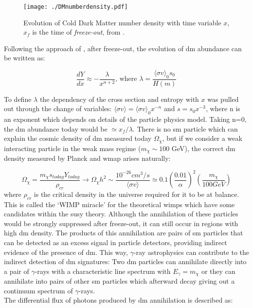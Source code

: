 \documentclass[main.tex]{subfiles}
\begin{document}
\begin{figure}[h]
\centering
 \texttt{[image: ./DMnumberdensity.pdf]}
  \caption{Evolution of Cold Dark Matter number density with time variable $x$, $x_{f}$ is the time of \textit{freeze-out}, from \cite{2017DMlectures}.}
    \label{fig:DMn}
\end{figure}

Following the approach of \cite{2017DMlectures}, after freeze-out, the evolution of \gls{dm} abundance can be written as:

\begin{equation}
    \frac{dY}{dx}\approx - \frac{\lambda}{x^{n+2}} \textrm{, where } \lambda = \frac{\langle\sigma v \rangle_{0}s_{0}}{H(m)}
\end{equation}

To define $\lambda$ the dependency of the cross section and entropy with $x$ was pulled out through the change of variables: $\langle\sigma v \rangle = \langle\sigma v \rangle_{0} x^{-n}$ and $s=s_{0}x^{-3}$, where n is an exponent which depends on details of the particle physics model. Taking n=0, the \gls{dm} abundance today would be $\simeq x_{f}/\lambda$.
There is no \gls{sm} particle which can explain the cosmic density of \gls{dm} measured today $\Omega_{\chi}$, but if we consider a weak interacting particle in the weak mass regime ($m_{\chi}\sim 100$ GeV), the correct \gls{dm} density measured by Planck and \gls{wmap} arises naturally:

\begin{equation}
    \Omega_{\chi}=\frac{m_{\chi}s_{today}Y_{today}}{\rho_{cr}}\rightarrow \Omega_{\chi} h^{2}\sim \frac{10^{-26}cm^{3}/s}{\langle\sigma v\rangle} \simeq 0.1 \left(\frac{0.01}{\alpha}\right)^{2}\left( \frac{m_{\chi}}{100 GeV}\right) 
\end{equation}
where $\rho_{cr}$ is the critical density in the universe required for it to be at balance.
This is called the `WIMP miracle' for the theoretical \glspl{wimp} which have some candidates within the \gls{susy} theory. Although the annihilation of these particles would be strongly suppressed after freeze-out, it can still occur in regions with high \gls{dm} density. The products of this annihilation are pairs of \gls{sm} particles that can be detected as an excess signal in particle detectors, providing indirect evidence of the presence of \gls{dm}. This way, $\gamma$-ray astrophysics can contribute to the indirect detection of \gls{dm} signatures: Two \gls{dm} particles can annihilate directly into a pair of $\gamma$-rays with a characteristic line spectrum with $E_{\gamma}=m_\chi$ or they can annihilate into pairs of other \gls{sm} particles which afterward decay giving out a continuum spectrum of $\gamma$-rays.\\
The differential flux of photons produced by \gls{dm} annihilation is described as:
\end{document}
